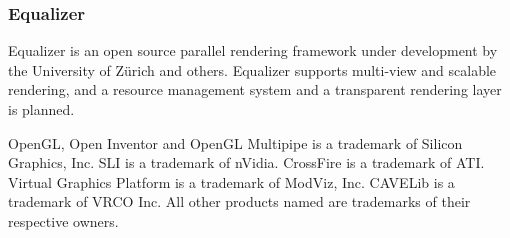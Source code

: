 \documentclass[10pt,a4paper]{scrartcl}
\begin{document}
\subsubsection{Equalizer}
Equalizer is an open source parallel rendering framework under development
by the University of Z\"urich and others. Equalizer supports multi-view
and scalable rendering, and a resource management system and a
transparent rendering layer is planned.

\vfill
\begin{spacing}{.5}{\footnotesize
OpenGL, Open Inventor and OpenGL Multipipe is a trademark of Silicon
Graphics, Inc. SLI is a trademark of nVidia. CrossFire is a trademark of
ATI. Virtual Graphics Platform is a trademark of ModViz, Inc. CAVELib is
a trademark of VRCO Inc. All other products named are trademarks of
their respective owners.
}\end{spacing}
\end{document}

